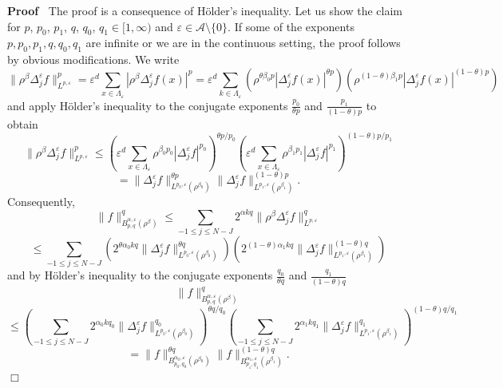 \documentclass[a4paper,11pt]{article}
\newenvironment{proof}{\noindent\textbf{Proof\ }}{\hspace*{\fill}$\Box$\medskip}
\numberwithin{equation}{section}
\begin{document}
\begin{proof}
  The proof is a consequence of H{\"o}lder's inequality. Let us show the claim
  for $p$, $p_0$, $p_1$, $q$, $q_0$, $q_1 \in [1, \infty)$ and $\varepsilon \in
  \mathcal{A} \setminus \{ 0 \}$. If some of the exponents $p, p_0, p_1, q,
  q_0, q_1$ are infinite or we are in the continuous setting, the proof
  follows by obvious modifications. We write
  \[ \| \rho^{\beta} \Delta_j^{\varepsilon} f \|_{L^{p, \varepsilon}}^p =
     \varepsilon^d \sum_{x \in \Lambda_{\varepsilon}} | \rho^{\beta}
     \Delta_j^{\varepsilon} f (x) |^p = \varepsilon^d \sum_{k \in
     \Lambda_{\varepsilon}} (\rho^{\theta \beta_0 p} | \Delta_j^{\varepsilon}
     f (x) |^{\theta p}) (\rho^{(1 - \theta) \beta_1 p} |
     \Delta_j^{\varepsilon} f (x) |^{(1 - \theta) p}) \]
  and apply H{\"o}lder's inequality to the conjugate exponents
  $\frac{p_0}{\theta p}$ and $\frac{p_1}{(1 - \theta) p}$ to obtain
  \[ \| \rho^{\beta} \Delta_j^{\varepsilon} f \|_{L^{p, \varepsilon}}^p
     \leqslant \left( \varepsilon^d \sum_{x \in \Lambda_{\varepsilon}}
     \rho^{\beta_0 p_0} | \Delta_j^{\varepsilon} f |^{p_0} \right)^{\theta p /
     p_0} \left( \varepsilon^d \sum_{x \in \Lambda_{\varepsilon}}
     \rho^{\beta_1 p_1} | \Delta_j^{\varepsilon} f |^{p_1} \right)^{(1 -
     \theta) p / p_1} \]
  \[ = \| \Delta_j^{\varepsilon} f \|^{\theta p}_{L^{p_0, \varepsilon}
     (\rho^{\beta_0})} \| \Delta_j^{\varepsilon} f \|^{(1 - \theta)
     p}_{L^{p_1, \varepsilon} (\rho^{\beta_1})} . \]
  Consequently,
  \[ \| f \|^q_{B^{\alpha, \varepsilon}_{p, q} (\rho^{\beta})} \leqslant
     \sum_{- 1 \leqslant j \leqslant N - J} 2^{\alpha k q} \| \rho^{\beta}
     \Delta_j^{\varepsilon} f \|_{L^{p, \varepsilon}}^q \]
  \[ \leqslant \sum_{- 1 \leqslant j \leqslant N - J} \left( 2^{\theta
     \alpha_0 k q} \| \Delta_j^{\varepsilon} f \|^{\theta q}_{L^{p_0,
     \varepsilon} (\rho^{\beta_0})} \right) \left( 2^{(1 - \theta) \alpha_1 k
     q} \| \Delta_j^{\varepsilon} f \|^{(1 - \theta) q}_{L^{p_1, \varepsilon}
     (\rho^{\beta_1})} \right) \]
  and by H{\"o}lder's inequality to the conjugate exponents $\frac{q_0}{\theta
  q}$ and $\frac{q_1}{(1 - \theta) q}$
  \[ \| f \|^q_{B^{\alpha, \varepsilon}_{p, q} (\rho^{\beta})} \]
  \[ \leqslant \left( \sum_{- 1 \leqslant j \leqslant N - J} 2^{\alpha_0 k
     q_0} \| \Delta_j^{\varepsilon} f \|^{q_0}_{L^{p_0, \varepsilon}
     (\rho^{\beta_0})} \right)^{\theta q / q_0} \left( \sum_{- 1 \leqslant j
     \leqslant N - J} 2^{\alpha_1 k q_1} \| \Delta_j^{\varepsilon} f
     \|^{q_1}_{L^{p_1, \varepsilon} (\rho^{\beta_1})} \right)^{(1 - \theta) q
     / q_1} \]
  \[ = \| f \|^{\theta q}_{B^{\alpha_0, \varepsilon}_{p_0, q_0}
     (\rho^{\beta_0})} \| f \|^{(1 - \theta) q}_{B^{\alpha_1,
     \varepsilon}_{p_1, q_1} (\rho^{\beta_1})} . \]
\end{proof}
\end{document}
